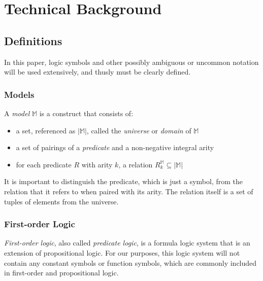 \section{Technical Background}

	\subsection{Definitions}

		In this paper, logic symbols and other possibly ambiguous or uncommon
		notation will be used extensively, and thusly must be clearly defined.

		\subsubsection{Models}

			A \emph{model} $\mathbb{M}$ is a construct that consists of:
			\begin{itemize}
			\item a set, referenced as $|\mathbb{M}|$, called the \emph{universe} or \emph{domain} of $\mathbb{M}$
			\item a set of pairings of a \emph{predicate} and a non-negative integral arity
			\item for each predicate $R$ with arity $k$, a relation $R^\mathbb{M}_k \subseteq |\mathbb{M}|$
			\end{itemize}
			It is important to distinguish the predicate, which is just a symbol,
			from the relation that it refers to when paired with its arity. The
			relation itself is a set of tuples of elements from the universe.

		\subsubsection{First-order Logic}

			\emph{First-order logic}, also called \emph{predicate logic}, is a
			formula logic system that is an extension of propositional logic. For
			our purposes, this logic system will not contain any constant symbols
			or function symbols, which are commonly included in first-order and
			propositional logic.


